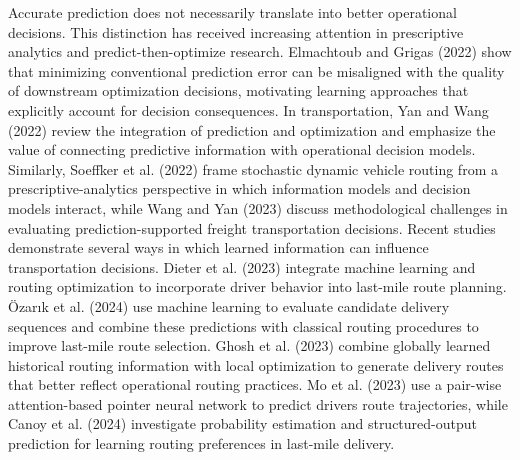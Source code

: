 \documentclass[
]{article}
\begin{document}
Accurate prediction does not necessarily translate into better
operational decisions. This distinction has received increasing
attention in prescriptive analytics and predict-then-optimize research.
Elmachtoub and Grigas (2022) show that minimizing conventional
prediction error can be misaligned with the quality of downstream
optimization decisions, motivating learning approaches that explicitly
account for decision consequences. In transportation, Yan and Wang
(2022) review the integration of prediction and optimization and
emphasize the value of connecting predictive information with
operational decision models. Similarly, Soeffker et al. (2022) frame
stochastic dynamic vehicle routing from a prescriptive-analytics
perspective in which information models and decision models interact,
while Wang and Yan (2023) discuss methodological challenges in
evaluating prediction-supported freight transportation decisions. Recent
studies demonstrate several ways in which learned information can
influence transportation decisions. Dieter et al. (2023) integrate
machine learning and routing optimization to incorporate driver behavior
into last-mile route planning. Özarık et al. (2024) use machine learning
to evaluate candidate delivery sequences and combine these predictions
with classical routing procedures to improve last-mile route selection.
Ghosh et al. (2023) combine globally learned historical routing
information with local optimization to generate delivery routes that
better reflect operational routing practices. Mo et al. (2023) use a
pair-wise attention-based pointer neural network to predict
drivers\textquotesingle{} route trajectories, while Canoy et al. (2024)
investigate probability estimation and structured-output prediction for
learning routing preferences in last-mile delivery.
\end{document}
